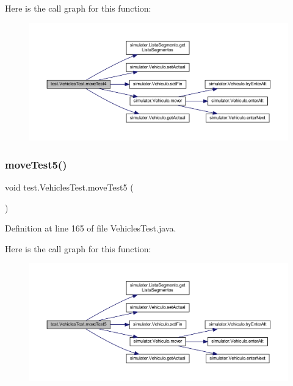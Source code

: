 Here is the call graph for this function\+:\nopagebreak
\begin{figure}[H]
\begin{center}
\leavevmode
\includegraphics[width=350pt]{classtest_1_1_vehicles_test_acb2d255019e8718669cb5d6105fd43fa_cgraph}
\end{center}
\end{figure}
\mbox{\label{classtest_1_1_vehicles_test_a11f99870b0a4caa2075a2bdeaf910523}} 
\subsubsection{\texorpdfstring{move\+Test5()}{moveTest5()}}
{\footnotesize\ttfamily void test.\+Vehicles\+Test.\+move\+Test5 (\begin{DoxyParamCaption}{ }\end{DoxyParamCaption})}



Definition at line 165 of file Vehicles\+Test.\+java.

Here is the call graph for this function\+:\nopagebreak
\begin{figure}[H]
\begin{center}
\leavevmode
\includegraphics[width=350pt]{classtest_1_1_vehicles_test_a11f99870b0a4caa2075a2bdeaf910523_cgraph}
\end{center}
\end{figure}
\mbox{\label{classtest_1_1_vehicles_test_add2a427b283ac60b944e500f0c66e20b}} 
